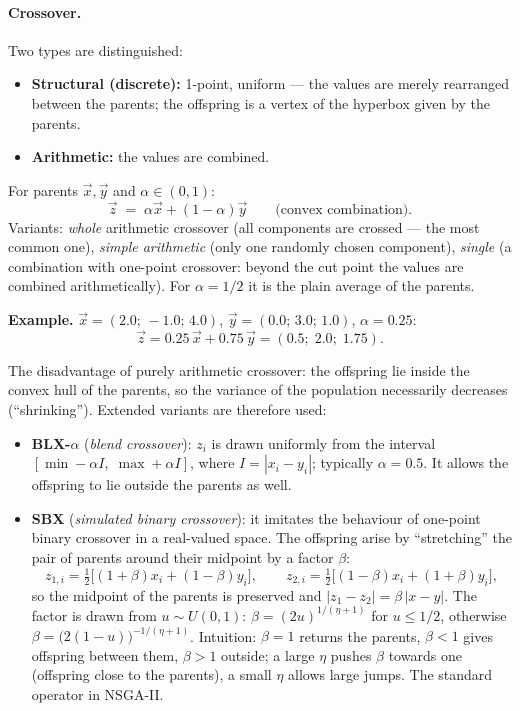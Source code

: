 \documentclass[11pt,a4paper]{article}
\theoremstyle{definition}
\providecommand{\uv}[1]{``#1''}
\begin{document}
\paragraph{Crossover.} Two types are distinguished:
\begin{itemize}
\item \textbf{Structural (discrete):} 1-point, uniform --- the values are merely
  rearranged between the parents; the offspring is a vertex of the hyperbox
  given by the parents.
\item \textbf{Arithmetic:} the values are combined.
\end{itemize}

\begin{defbox}
For parents $\vec x, \vec y$ and $\alpha \in (0,1)$:
\[
\vec z \;=\; \alpha \vec x + (1-\alpha)\vec y \qquad\text{(convex combination)}.
\]
Variants: \emph{whole} arithmetic crossover (all components are crossed --- the
most common one), \emph{simple arithmetic} (only one randomly chosen
component), \emph{single} (a combination with one-point crossover: beyond the
cut point the values are combined arithmetically). For $\alpha = 1/2$ it is the
plain average of the parents.
\end{defbox}

\textbf{Example.} $\vec x = (2.0;\, -1.0;\, 4.0)$,
$\vec y = (0.0;\, 3.0;\, 1.0)$, $\alpha = 0.25$:
\[
\vec z = 0.25\,\vec x + 0.75\,\vec y = (0.5;\; 2.0;\; 1.75).
\]

The disadvantage of purely arithmetic crossover: the offspring lie inside the
convex hull of the parents, so the variance of the population necessarily
decreases (\uv{shrinking}). Extended variants are therefore used:
\begin{itemize}
\item \textbf{BLX-$\alpha$} (\emph{blend crossover}): $z_i$ is drawn uniformly
  from the interval $[\min - \alpha I,\; \max + \alpha I]$, where
  $I = |x_i - y_i|$; typically $\alpha = 0.5$. It allows the offspring to lie
  outside the parents as well.
\item \textbf{SBX} (\emph{simulated binary crossover}): it imitates the
  behaviour of one-point binary crossover in a real-valued space. The offspring
  arise by \uv{stretching} the pair of parents around their midpoint by a
  factor $\beta$:
  \[
  z_{1,i} = \tfrac12\big[(1+\beta)x_i + (1-\beta)y_i\big],\qquad
  z_{2,i} = \tfrac12\big[(1-\beta)x_i + (1+\beta)y_i\big],
  \]
  so the midpoint of the parents is preserved and $|z_1 - z_2| = \beta\,|x -
  y|$. The factor is drawn from $u \sim U(0,1)$: $\beta = (2u)^{1/(\eta+1)}$
  for $u \le 1/2$, otherwise $\beta = \big(2(1-u)\big)^{-1/(\eta+1)}$.
  Intuition: $\beta = 1$ returns the parents, $\beta < 1$ gives offspring
  between them, $\beta > 1$ outside; a large $\eta$ pushes $\beta$ towards one
  (offspring close to the parents), a small $\eta$ allows large jumps. The
  standard operator in NSGA-II.
\end{itemize}
\end{document}

